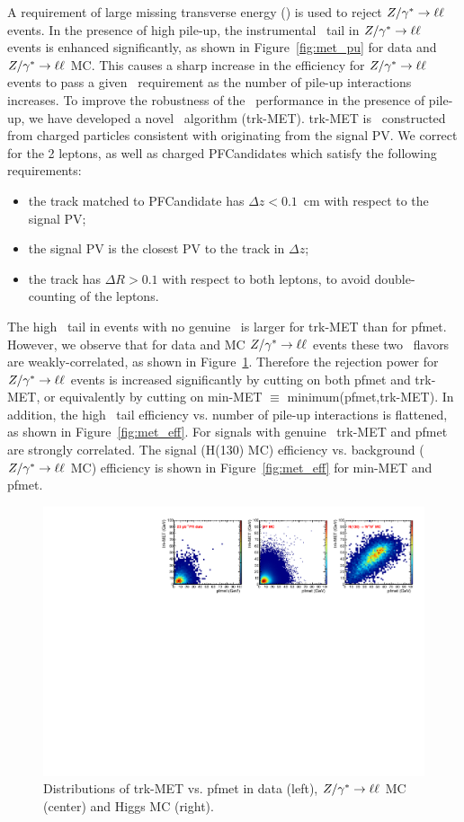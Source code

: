 A requirement of large missing transverse energy (\met) is used to reject $Z/\gamma^*\to\ell\ell$ events.
In the presence of high pile-up, the instrumental \met\ tail in $Z/\gamma^*\to\ell\ell$ events is enhanced
significantly, as shown in Figure~\ref{fig:met_pu} for data and $Z/\gamma^*\to\ell\ell$ MC. This causes a sharp increase in the
efficiency for $Z/\gamma^*\to\ell\ell$ events to pass a given \met\ requirement as the number of pile-up
interactions increases. To improve the robustness of the \met\ performance
in the presence of pile-up, we have developed a novel \met\ algorithm (trk-MET).
trk-MET is \met\ constructed from charged particles consistent with originating from
the signal PV. We correct for the 2 leptons, as well as charged PFCandidates which satisfy
the following requirements:
\begin{itemize}
\item the track matched to PFCandidate has $\Delta z < 0.1$~cm with respect to the signal PV;
\item the signal PV is the closest PV to the track in $\Delta z$;
\item the track has $\Delta R > 0.1$ with respect to both leptons, to avoid 
double-counting of the leptons.
\end{itemize}
The high \met\ tail in events with no genuine \met\ is larger for trk-MET than for pfmet. However,
we observe that for data and MC $Z/\gamma^*\to\ell\ell$ events these two \met\ flavors are weakly-correlated, as shown
in Figure~\ref{fig:met_scatter}. Therefore the rejection power for $Z/\gamma^*\to\ell\ell$ events is increased significantly
by cutting on both pfmet and trk-MET, or equivalently by cutting on min-MET $\equiv$ minimum(pfmet,trk-MET).
In addition, the high \met\ tail efficiency vs. number of pile-up interactions is flattened, as shown
in Figure~\ref{fig:met_eff}. For signals with genuine \met\, trk-MET and pfmet are strongly correlated. 
The signal (H(130) MC) efficiency vs. background ($Z/\gamma^*\to\ell\ell$ MC) efficiency is shown in 
Figure~\ref{fig:met_eff} for min-MET and pfmet.
 
\begin{figure}[hbt]
\begin{center}
\includegraphics[width=1\linewidth]{figures/met_scatter.pdf} 
\caption{\label{fig:met_scatter}\protect Distributions of trk-MET vs. pfmet in data (left), $Z/\gamma^*\to\ell\ell$ MC (center) and Higgs MC (right).}
\end{center}
\end{figure}

